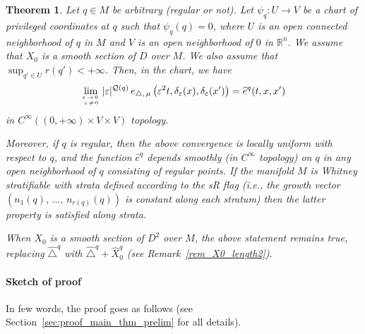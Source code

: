 \documentclass[AHL,Unicode,published]{cedram}
\newcommand*\R{\mathbb{R}}
\newcommand{\calQ}{\mathcal{Q}}
\newtheorem{theol}{Theorem}
\begin{document}
\begin{theol}\label{main_thm_weak}
Let $q\in M$ be arbitrary (regular or not). Let $\psi_{q}:U\rightarrow V$ be a chart of privileged coordinates at $q$ such that $\psi_{q}(q)=0$, where $U$ is an open connected neighborhood of $q$ in $M$ and $V$ is an open neighborhood of $0$ in $\R^n$. We assume that $X_0$ is a smooth section of $D$ over $M$. We also assume that $\sup_{q'\in U} r(q')<+\infty$. Then, in the chart, we have
\begin{equation}\label{limit_main_thm_weak}
\lim_{\varepsilon\,\rightarrow\,0\,\atop\,\varepsilon\,\neq\,0}
\vert\varepsilon\vert^{\calQ(q)}\, e_{\triangle,\,\mu}\left(\varepsilon^2 t,\delta_\varepsilon(x),\delta_\varepsilon(x')\right) = \widehat{e}^{q}(t,x,x')
\end{equation}
in $C^\infty((0,+\infty)\times V\times V)$ topology.

Moreover, if $q$ is regular, then the above convergence is locally uniform with respect to $q$, and the function $\widehat{e}^{q}$ depends smoothly (in $C^\infty$ topology) on $q$ in any open neighborhood of $q$ consisting of regular points. If the manifold $M$ is Whitney stratifiable with strata defined according to the sR flag (i.e., the growth vector $(n_1(q),\,\ldots,\,n_{r(q)}(q))$ is constant along each stratum) then the latter property is satisfied along strata.

When $X_0$ is a smooth section of $D^2$ over $M$, the above statement remains true, replacing $\widehat{\triangle}^{q}$ with $\widehat{\triangle}^{q}+\widehat{X}_0^{q}$ (see Remark~\ref{rem_X0_length2}).
\end{theol}

\goodbreak
\paragraph{Sketch of proof}
In few words, the proof goes as follows (see Section~\ref{sec:proof_main_thm_prelim} for all details).
\end{document}
